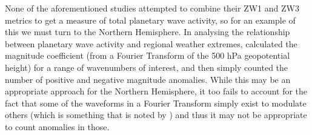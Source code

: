 None of the aforementioned studies attempted to combine their ZW1 and ZW3 metrics to get a measure of total planetary wave activity, so for an example of this we must turn to the Northern Hemisphere. In analysing the relationship between planetary wave activity and regional weather extremes, \citet{Screen2014} calculated the magnitude coefficient (from a Fourier Transform of the 500 hPa geopotential height) for a range of wavenumbers of interest, and then simply counted the number of positive and negative magnitude anomalies. While this may be an appropriate approach for the Northern Hemisphere, it too fails to account for the fact that some of the waveforms in a Fourier Transform simply exist to modulate others (which is something that is noted by \citet{Screen2014}) and thus it may not be appropriate to count anomalies in those.  